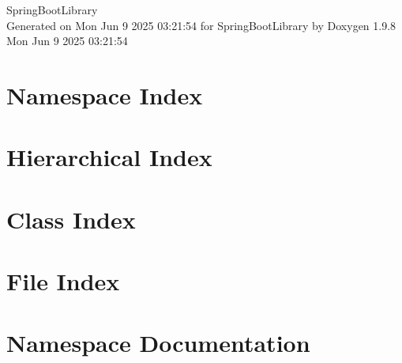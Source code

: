 \documentclass[twoside]{book}
\newcommand{\+}{\discretionary{\mbox{\scriptsize$\hookleftarrow$}}{}{}}
\newcommand{\clearemptydoublepage}{%
    \newpage{\pagestyle{empty}\cleardoublepage}%
  }
\begin{document}
  \raggedbottom
    \hypersetup{pageanchor=false,
                bookmarksnumbered=true,
                pdfencoding=unicode
               }
  \begin{titlepage}
  \vspace*{7cm}
  \begin{center}%
  {\Large Spring\+Boot\+Library}\\
  \vspace*{1cm}
  {\large Generated on Mon Jun 9 2025 03\+:21\+:54 for Spring\+Boot\+Library by Doxygen 1.9.8}\\
    \vspace*{0.5cm}
    {\small Mon Jun 9 2025 03:21:54}
  \end{center}
  \end{titlepage}
  \clearemptydoublepage
  \tableofcontents
  \clearemptydoublepage
  \hypersetup{pageanchor=true}
\chapter{Namespace Index}

\chapter{Hierarchical Index}

\chapter{Class Index}

\chapter{File Index}

\chapter{Namespace Documentation}








\end{document}
